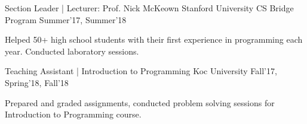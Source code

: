 \begin{cventries}
  \cvopenentry
    {Section Leader | Lecturer: Prof. Nick McKeown } %
    {Stanford University CS Bridge Program} %
    {}
    {Summer'17, Summer'18} %
    {
      \begin{cvitems} %
        \item {Helped 50+ high school students with their first experience in programming each year. Conducted laboratory sessions.}
      \end{cvitems}
    }

  \cvopenentry
    {Teaching Assistant | Introduction to Programming } %
    {Koc University} %
    {}
    {Fall'17, Spring'18, Fall'18} %
    {
      \begin{cvitems} %
        \item {Prepared and graded assignments, conducted problem solving sessions for Introduction to Programming course.}
      \end{cvitems}
    }



\end{cventries}

